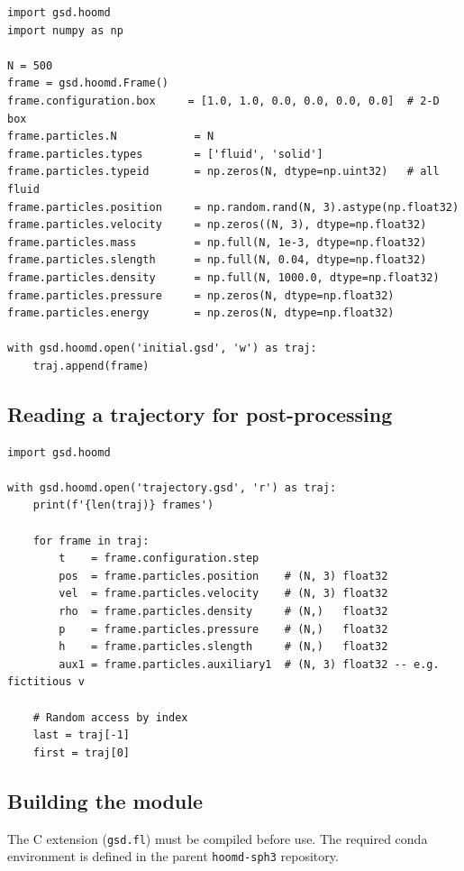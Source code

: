 \documentclass[10pt,a4paper]{article}
\begin{document}
\begin{lstlisting}[style=python]
import gsd.hoomd
import numpy as np

N = 500
frame = gsd.hoomd.Frame()
frame.configuration.box     = [1.0, 1.0, 0.0, 0.0, 0.0, 0.0]  # 2-D box
frame.particles.N            = N
frame.particles.types        = ['fluid', 'solid']
frame.particles.typeid       = np.zeros(N, dtype=np.uint32)   # all fluid
frame.particles.position     = np.random.rand(N, 3).astype(np.float32)
frame.particles.velocity     = np.zeros((N, 3), dtype=np.float32)
frame.particles.mass         = np.full(N, 1e-3, dtype=np.float32)
frame.particles.slength      = np.full(N, 0.04, dtype=np.float32)
frame.particles.density      = np.full(N, 1000.0, dtype=np.float32)
frame.particles.pressure     = np.zeros(N, dtype=np.float32)
frame.particles.energy       = np.zeros(N, dtype=np.float32)

with gsd.hoomd.open('initial.gsd', 'w') as traj:
    traj.append(frame)
\end{lstlisting}

\subsection{Reading a trajectory for post-processing}

\begin{lstlisting}[style=python]
import gsd.hoomd

with gsd.hoomd.open('trajectory.gsd', 'r') as traj:
    print(f'{len(traj)} frames')

    for frame in traj:
        t    = frame.configuration.step
        pos  = frame.particles.position    # (N, 3) float32
        vel  = frame.particles.velocity    # (N, 3) float32
        rho  = frame.particles.density     # (N,)   float32
        p    = frame.particles.pressure    # (N,)   float32
        h    = frame.particles.slength     # (N,)   float32
        aux1 = frame.particles.auxiliary1  # (N, 3) float32 -- e.g. fictitious v

    # Random access by index
    last = traj[-1]
    first = traj[0]
\end{lstlisting}

\subsection{Building the module}

The C extension (\texttt{gsd.fl}) must be compiled before use.  The required
conda environment is defined in the parent \texttt{hoomd-sph3} repository.
\end{document}
